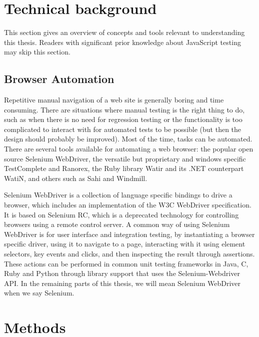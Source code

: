 \documentclass[11pt]{article}
\begin{document}
\section{Technical background}

This section gives an overview of concepts and tools relevant to understanding this thesis. Readers with significant prior knowledge about JavaScript testing may skip this section.

\subsection{Browser Automation}

Repetitive manual navigation of a web site is generally boring and time consuming. There are situations where manual testing is the right thing to do, such as when there is no need for regression testing or the functionality is too complicated to interact with for automated tests to be possible (but then the design should probably be improved). Most of the time, tasks can be automated. There are several tools available for automating a web browser: the popular open source Selenium WebDriver, the versatile but proprietary and windows specific TestComplete and Ranorex, the Ruby library Watir and its .NET counterpart WatiN, and others such as Sahi and Windmill.

Selenium WebDriver is a collection of language specific bindings to drive a browser, which includes an implementation of the W3C WebDriver specification. It is based on Selenium RC, which is a deprecated technology for controlling browsers using a remote control server. A common way of using Selenium WebDriver is for user interface and integration testing, by instantiating a browser specific driver, using it to navigate to a page, interacting with it using element selectors, key events and clicks, and then inspecting the result through assertions. These actions can be performed in common unit testing frameworks in Java, C\nolinebreak\hspace{-.05em}\raisebox{.3ex}{\scriptsize\bf \#}, Ruby and Python through library support that uses the Selenium-Webdriver API. \cite{Selenium} In the remaining parts of this thesis, we will mean Selenium WebDriver when we say Selenium.

\section{Methods}
\end{document}
